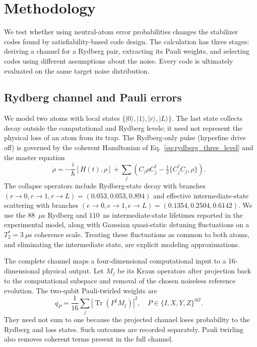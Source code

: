 \section{Methodology}
\label{sec:methodology}
We test whether using neutral-atom error probabilities changes the stabilizer
codes found by satisfiability-based code design. The calculation has three
stages: deriving a channel for a Rydberg pair, extracting its Pauli weights,
and selecting codes using different assumptions about the noise. Every code
is ultimately evaluated on the same target noise distribution.

\subsection{Rydberg channel and Pauli errors}
\label{sec:method_channel}
We model two atoms with local states
$\{|0\rangle,|1\rangle,|r\rangle,|L\rangle\}$.
The last state collects decay outside the computational and Rydberg levels;
it need not represent the physical loss of an atom from its trap.
The Rydberg-only pulse (hyperfine drive off) is governed by the coherent
Hamiltonian of Eq.~\eqref{eq:rydberg_three_level} and the master equation
\begin{equation}
\dot\rho=-\frac{i}{\hbar}[H(t),\rho]+
\sum_j\left(C_j\rho C_j^\dagger-
\tfrac12\{C_j^\dagger C_j,\rho\}\right).
\label{eq:res_lindblad}
\end{equation}
The collapse operators include Rydberg-state decay with branches
$(r\!\to\!0,r\!\to\!1,r\!\to\!L)=(0.053,0.053,0.894)$
and effective intermediate-state scattering with branches
$(e\!\to\!0,e\!\to\!1,e\!\to\!L)=(0.1354,0.2504,0.6142)$.
We use the 88~$\mu$s Rydberg and 110~ns intermediate-state lifetimes
reported in the experimental model, along with Gaussian quasi-static
detuning fluctuations on a $T_2^*=3~\mu$s coherence scale.
Treating these fluctuations as common to both atoms, and eliminating
the intermediate state, are explicit modeling approximations.

The complete channel maps a four-dimensional computational input to a
16-dimensional physical output. Let $M_j$ be its Kraus operators after
projection back to the computational subspace and removal of the chosen
noiseless reference evolution. The two-qubit Pauli-twirled weights are
\begin{equation}
q_P=\frac1{16}\sum_j
|\operatorname{Tr}(P^\dagger M_j)|^2,\quad
P\in\{I,X,Y,Z\}^{\otimes2}.
\label{eq:res_pauli}
\end{equation}
They need not sum to one because the projected channel loses probability
to the Rydberg and loss states. Such outcomes are recorded separately.
Pauli twirling also removes coherent terms present in the full channel.

